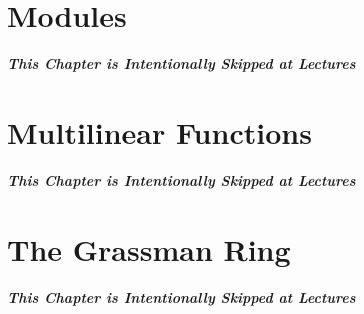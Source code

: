 \documentclass[C:/LATEX/MAS212/Summary/MAS212.tex]{subfiles}
\begin{document}


\section{Modules}

\textit{\textbf{This Chapter is Intentionally Skipped at Lectures}}

\section{Multilinear Functions}

\textit{\textbf{This Chapter is Intentionally Skipped at Lectures}}

\section{The Grassman Ring}

\textit{\textbf{This Chapter is Intentionally Skipped at Lectures}}
\end{document}
